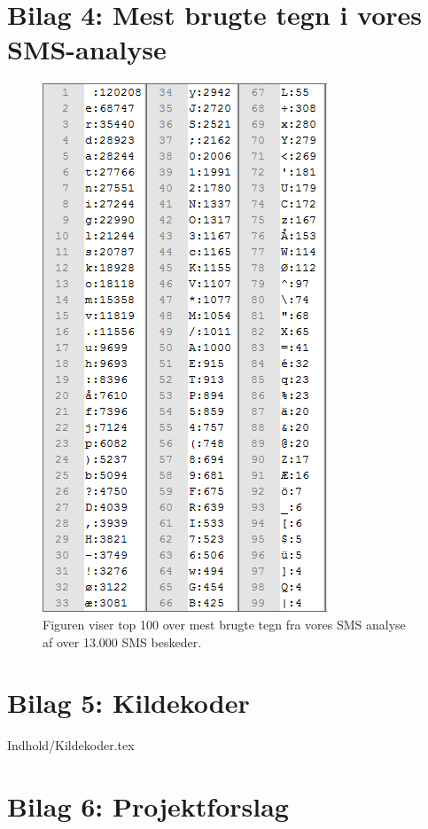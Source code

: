 \chapter*{Bilag 4: Mest brugte tegn i vores SMS-analyse}
\thispagestyle{empty}
\setcounter{page}{1}
\begin{figure}[H]
\centering
\includegraphics []{Billeder/SMSbilag.png}
\caption {Figuren viser top 100 over mest brugte tegn fra vores SMS analyse af over 13.000 SMS beskeder.}
\label {SMSanalyse}
\end{figure}
\thispagestyle{empty}

\chapter*{Bilag 5: Kildekoder}
\setcounter{page}{1}
 {Indhold/Kildekoder.tex}

\chapter*{Bilag 6: Projektforslag}
\thispagestyle{empty}
